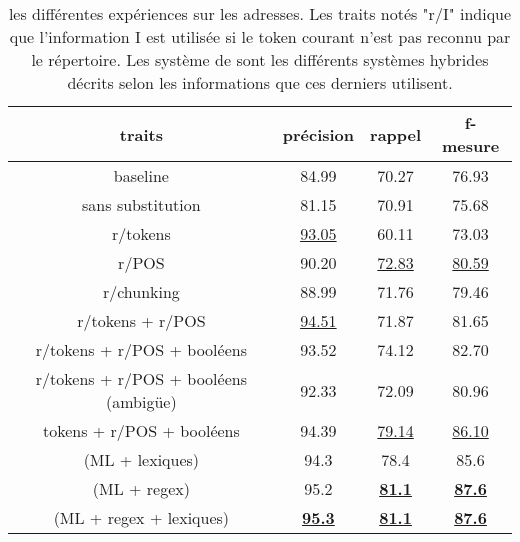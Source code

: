 \documentclass[PhD-Yoann-Dupont.tex]{subfiles}
\begin{document}
\begin{table}[ht!]
\centering
\begin{tabular}{|c|ccc|}
\hline
traits            & précision & rappel & f-mesure\\
\hline
baseline          & 84.99     & 70.27  & 76.93 \\
sans substitution & 81.15     & 70.91  & 75.68 \\
r/tokens            & \underline{93.05}     & 60.11  & 73.03 \\
r/POS             & 90.20     & \underline{72.83}  & \underline{80.59} \\
r/chunking        & 88.99     & 71.76  & 79.46 \\
\hline
r/tokens + r/POS                      & \underline{94.51} & 71.87             & 81.65 \\
r/tokens + r/POS + booléens           & 93.52             & 74.12             & 82.70 \\
r/tokens + r/POS + booléens (ambigüe) & 92.33             & 72.09             & 80.96 \\
tokens + r/POS + booléens             & 94.39             & \underline{79.14} & \underline{86.10} \\
\hline
\citet{yu2007high} (ML + lexiques)         & 94.3 & 78.4 & 85.6 \\
\citet{yu2007high} (ML + regex)            & 95.2 & \underline{\textbf{81.1}} & \underline{\textbf{87.6}} \\
\citet{yu2007high} (ML + regex + lexiques) & \underline{\textbf{95.3}} & \underline{\textbf{81.1}} & \underline{\textbf{87.6}} \\
\hline
\end{tabular}
\caption{les différentes expériences sur les adresses. Les traits notés "r/I" indique que l'information I est utilisée si le token courant n'est pas reconnu par le répertoire. Les système de \citet{yu2007high} sont les différents systèmes hybrides décrits selon les informations que ces derniers utilisent.}
\label{tab:address-quality}
\end{table}
\end{document}
